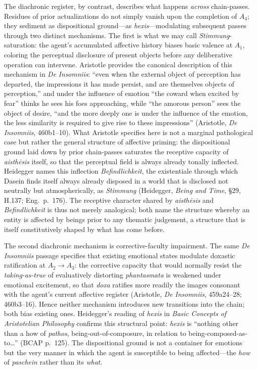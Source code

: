 The diachronic register, by contrast, describes what happens \textit{across} chain-passes. Residues of prior actualizations do not simply vanish upon the completion of $A_4$; they sediment as dispositional ground---as \textit{hexis}---modulating subsequent passes through two distinct mechanisms. The first is what we may call \textit{Stimmung}-saturation: the agent's accumulated affective history biases basic valence at $A_1$, coloring the perceptual disclosure of present objects before any deliberative operation can intervene. Aristotle provides the canonical description of this mechanism in \textit{De Insomniis}: ``even when the external object of perception has departed, the impressions it has made persist, and are themselves objects of perception,'' and under the influence of emotion ``the coward when excited by fear'' thinks he sees his foes approaching, while ``the amorous person'' sees the object of desire, ``and the more deeply one is under the influence of the emotion, the less similarity is required to give rise to these impressions'' (Aristotle, \textit{De Insomniis}, 460b1--10). What Aristotle specifies here is not a marginal pathological case but rather the general structure of affective priming: the dispositional ground laid down by prior chain-passes saturates the receptive capacity of \textit{aisthēsis} itself, so that the perceptual field is always already tonally inflected. Heidegger names this inflection \textit{Befindlichkeit}, the existentiale through which Dasein finds itself always already disposed in a world that is disclosed not neutrally but atmospherically, as \textit{Stimmung} (Heidegger, \textit{Being and Time}, \S 29, H.137; Eng.~p.~176). The receptive character shared by \textit{aisthēsis} and \textit{Befindlichkeit} is thus not merely analogical; both name the structure whereby an entity is affected by beings prior to any thematic judgement, a structure that is itself constitutively shaped by what has come before.

The second diachronic mechanism is corrective-faculty impairment. The same \textit{De Insomniis} passage specifies that existing emotional states modulate doxastic ratification at $A_2 \rightarrow A_3$: the corrective capacity that would normally resist the \textit{taking-as-true} of evaluatively distorting \textit{phantasmata} is weakened under emotional excitement, so that \textit{doxa} ratifies more readily the images consonant with the agent's current affective register (Aristotle, \textit{De Insomniis}, 459a24--28; 460b3--16). Hence neither mechanism introduces new transitions into the chain; both bias existing ones. Heidegger's reading of \textit{hexis} in \textit{Basic Concepts of Aristotelian Philosophy} confirms this structural point: \textit{hexis} is ``nothing other than a how of \textit{pathos}, being-out-of-composure, in relation to being-composed-as-to\ldots'' (BCAP p.~125). The dispositional ground is not a container for emotions but the very manner in which the agent is susceptible to being affected---the \textit{how} of \textit{paschein} rather than its \textit{what}.

